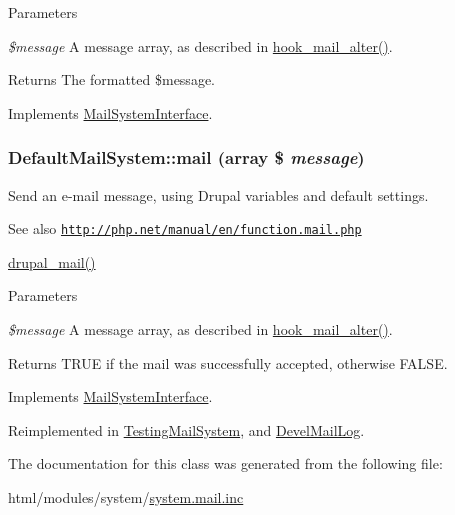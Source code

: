 \begin{DoxyParams}{Parameters}
\item[{\em \$message}]A message array, as described in \hyperlink{group__hooks_gaad1d55a8e7b359933f462a9ca5b2ede0}{hook\_\-mail\_\-alter()}.\end{DoxyParams}
\begin{DoxyReturn}{Returns}
The formatted \$message. 
\end{DoxyReturn}


Implements \hyperlink{interfaceMailSystemInterface_a430f4c9b4c5f3825f6a9ec73e7b5e5d6}{MailSystemInterface}.\hypertarget{classDefaultMailSystem_a77a30a4f7b330e8fc811d8030004bb29}{
\subsubsection[{mail}]{\setlength{\rightskip}{0pt plus 5cm}DefaultMailSystem::mail (array \$ {\em message})}}
\label{classDefaultMailSystem_a77a30a4f7b330e8fc811d8030004bb29}
Send an e-\/mail message, using Drupal variables and default settings.

\begin{DoxySeeAlso}{See also}
\href{http://php.net/manual/en/function.mail.php}{\tt http://php.net/manual/en/function.mail.php} 

\hyperlink{mail_8inc_ab80781fd7273975a77cbbd13300eddbf}{drupal\_\-mail()}
\end{DoxySeeAlso}

\begin{DoxyParams}{Parameters}
\item[{\em \$message}]A message array, as described in \hyperlink{group__hooks_gaad1d55a8e7b359933f462a9ca5b2ede0}{hook\_\-mail\_\-alter()}. \end{DoxyParams}
\begin{DoxyReturn}{Returns}
TRUE if the mail was successfully accepted, otherwise FALSE. 
\end{DoxyReturn}


Implements \hyperlink{interfaceMailSystemInterface_a8dd560f7879b93d1fd3497b27a3b08f7}{MailSystemInterface}.

Reimplemented in \hyperlink{classTestingMailSystem_ae49025dfeb69acaff2df6035a25defbf}{TestingMailSystem}, and \hyperlink{classDevelMailLog_a1179208e4b2b37addefcc9f8ed9be0b0}{DevelMailLog}.

The documentation for this class was generated from the following file:\begin{DoxyCompactItemize}
\item 
html/modules/system/\hyperlink{system_8mail_8inc}{system.mail.inc}\end{DoxyCompactItemize}

